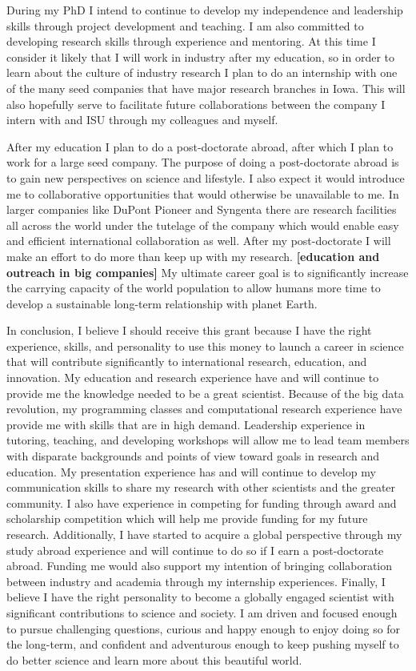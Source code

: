 \documentclass[12pt]{amsart}
\begin{document}
During my PhD I intend to continue to develop my independence and leadership skills through project development and teaching.  
I am also committed to developing research skills through experience and mentoring.  
At this time I consider it likely that I will work in industry after my education, so in order to learn about the culture of industry research I plan to do an internship with one of the many seed companies that have major research branches in Iowa.
This will also hopefully serve to facilitate future collaborations between the company I intern with and ISU through my colleagues and myself.

After my education I plan to do a post-doctorate abroad, after which I plan to work for a large seed company.
The purpose of doing a post-doctorate abroad is to gain new perspectives on science and lifestyle.
I also expect it would introduce me to collaborative opportunities that would otherwise be unavailable to me.
In larger companies like DuPont Pioneer and Syngenta there are research facilities all across the world under the tutelage of the company which would enable easy and efficient international collaboration as well.
After my post-doctorate I will make an effort to do more than keep up with my research.
 \textbf{[education and outreach in big companies]}
My ultimate career goal is to significantly increase the carrying capacity of the world population to allow humans more time to develop a sustainable long-term relationship with planet Earth.

In conclusion, I believe I should receive this grant because I have the right experience, skills, and personality to use this money to launch a career in science that will contribute significantly to international research, education, and innovation.  
My education and research experience have and will continue to provide me the knowledge needed to be a great scientist.  
Because of the big data revolution, my programming classes and computational research experience have provide me with skills that are in high demand.
Leadership experience in tutoring, teaching, and developing workshops will allow me to lead team members with disparate backgrounds and points of view toward goals in research and education.
My presentation experience has and will continue to develop my communication skills to share my research with other scientists and the greater community.
I also have experience in competing for funding through award and scholarship competition which will help me provide funding for my future research.  
Additionally, I have started to acquire a global perspective through my study abroad experience and will continue to do so if I earn a post-doctorate abroad.  
Funding me would also support my intention of bringing collaboration between industry and academia through my internship experiences.
Finally, I believe I have the right personality to become a globally engaged scientist with significant contributions to science and society.  
I am driven and focused enough to pursue challenging questions, curious and happy enough to enjoy doing so for the long-term, and confident and adventurous enough to keep pushing myself to do better science and learn more about this beautiful world.
\end{document}
